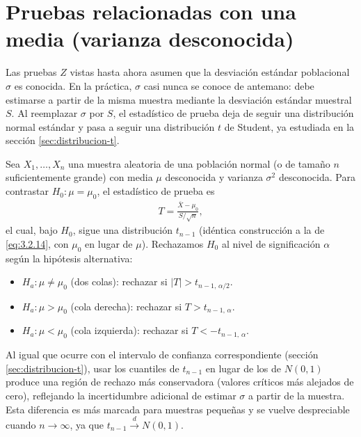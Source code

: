 \section{Pruebas relacionadas con una media (varianza desconocida)}
\label{sec:prueba-t-media}

Las pruebas $Z$ vistas hasta ahora asumen que la desviación estándar poblacional $\sigma$ es conocida. En la práctica, $\sigma$ casi nunca se conoce de antemano: debe estimarse a partir de la misma muestra mediante la desviación estándar muestral $S$. Al reemplazar $\sigma$ por $S$, el estadístico de prueba deja de seguir una distribución normal estándar y pasa a seguir una distribución $t$ de Student, ya estudiada en la sección \ref{sec:distribucion-t}.

\begin{teorema}
	Sea $X_1, \ldots, X_n$ una muestra aleatoria de una población normal (o de tamaño $n$ suficientemente grande) con media $\mu$ desconocida y varianza $\sigma^2$ desconocida. Para contrastar $H_0: \mu = \mu_0$, el estadístico de prueba es
	\begin{align}
		\label{eq:6.4.1}
		T = \frac{\bar{X} - \mu_0}{S/\sqrt{n}},
	\end{align}
	el cual, bajo $H_0$, sigue una distribución $t_{n-1}$ (idéntica construcción a la de \eqref{eq:3.2.14}, con $\mu_0$ en lugar de $\mu$). Rechazamos $H_0$ al nivel de significación $\alpha$ según la hipótesis alternativa:
	\begin{itemize}
		\item $H_a: \mu \neq \mu_0$ (dos colas): rechazar si $|T| > t_{n-1,\,\alpha/2}$.
		\item $H_a: \mu > \mu_0$ (cola derecha): rechazar si $T > t_{n-1,\,\alpha}$.
		\item $H_a: \mu < \mu_0$ (cola izquierda): rechazar si $T < -t_{n-1,\,\alpha}$.
	\end{itemize}
\end{teorema}

\begin{observacion}
	Al igual que ocurre con el intervalo de confianza correspondiente (sección \ref{sec:distribucion-t}), usar los cuantiles de $t_{n-1}$ en lugar de los de $N(0,1)$ produce una región de rechazo más conservadora (valores críticos más alejados de cero), reflejando la incertidumbre adicional de estimar $\sigma$ a partir de la muestra. Esta diferencia es más marcada para muestras pequeñas y se vuelve despreciable cuando $n \to \infty$, ya que $t_{n-1} \xrightarrow{d} N(0,1)$.
\end{observacion}

